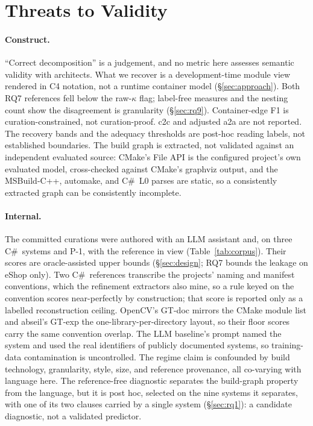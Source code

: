 \section{Threats to Validity}
\label{sec:threats}


\paragraph{Construct.} ``Correct decomposition'' is a judgement, and no metric here assesses
semantic validity with architects. What we recover is a development-time module view rendered in
C4 notation, not a runtime container model (\S\ref{sec:approach}). Both RQ7
references fell below the raw-$\kappa$ flag; label-free measures and the nesting count show the
disagreement is granularity (\S\ref{sec:rq9}). Container-edge F1 is
curation-constrained, not curation-proof. c2c and adjusted a2a are not reported. The recovery
bands and the adequacy thresholds are post-hoc reading labels, not established boundaries. The
build graph is extracted, not validated against an independent evaluated source: CMake's File
API is the configured project's own evaluated model, cross-checked against CMake's graphviz
output, and the MSBuild-C++, automake, and C\#\ L0 parses are static, so a consistently
extracted graph can be consistently incomplete.

\paragraph{Internal.} The committed curations were authored with an LLM assistant and, on three
C\#\ systems and P-1, with the reference in view (Table~\ref{tab:corpus}). Their scores are
oracle-assisted upper bounds (\S\ref{sec:design}; RQ7 bounds the leakage on eShop only). Two C\#\ references transcribe the projects' naming and manifest
conventions, which the refinement extractors also mine, so a rule keyed on the convention scores
near-perfectly by construction; that score is reported only as a labelled reconstruction ceiling.
OpenCV's GT-doc mirrors the CMake module list and abseil's GT-exp the one-library-per-directory
layout, so their floor scores carry the same convention overlap. The LLM baseline's prompt named
the system and used the real identifiers of publicly documented systems, so training-data
contamination is uncontrolled.
The regime claim is confounded by build technology, granularity, style, size, and reference
provenance, all co-varying with language here. The reference-free diagnostic separates the
build-graph property from the language, but it is post hoc, selected on the nine systems it
separates, with one of its two clauses carried by a single system (\S\ref{sec:rq1}): a
candidate diagnostic, not a validated predictor.


